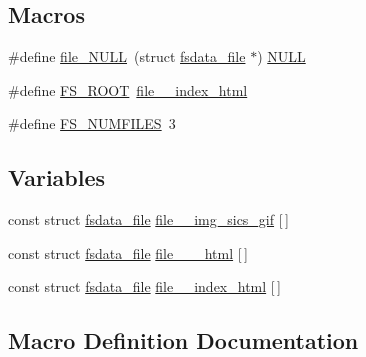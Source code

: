 \subsection*{Macros}
\begin{DoxyCompactItemize}
\item 
\#define \hyperlink{openmote-cc2538_2lwip_2src_2apps_2httpd_2fsdata_8c_a4a4bf9866c570a1420eb218034e0dfde}{file\+\_\+\+N\+U\+LL}~(struct \hyperlink{structfsdata__file}{fsdata\+\_\+file} $\ast$) \hyperlink{openmote-cc2538_2lwip_2src_2include_2lwip_2def_8h_a070d2ce7b6bb7e5c05602aa8c308d0c4}{N\+U\+LL}
\item 
\#define \hyperlink{openmote-cc2538_2lwip_2src_2apps_2httpd_2fsdata_8c_a579e616a9072321cb4da8aa2d64252f2}{F\+S\+\_\+\+R\+O\+OT}~\hyperlink{openmote-cc2538_2lwip_2src_2apps_2httpd_2fsdata_8c_a1908ae237b89f877e8ca1938f471caef}{file\+\_\+\+\_\+index\+\_\+html}
\item 
\#define \hyperlink{openmote-cc2538_2lwip_2src_2apps_2httpd_2fsdata_8c_aa06c00919f77418ad5d5e54141926500}{F\+S\+\_\+\+N\+U\+M\+F\+I\+L\+ES}~3
\end{DoxyCompactItemize}
\subsection*{Variables}
\begin{DoxyCompactItemize}
\item 
const struct \hyperlink{structfsdata__file}{fsdata\+\_\+file} \hyperlink{openmote-cc2538_2lwip_2src_2apps_2httpd_2fsdata_8c_ae4750db2489eb9a18a9483d52544500e}{file\+\_\+\+\_\+img\+\_\+sics\+\_\+gif} \mbox{[}$\,$\mbox{]}
\item 
const struct \hyperlink{structfsdata__file}{fsdata\+\_\+file} \hyperlink{openmote-cc2538_2lwip_2src_2apps_2httpd_2fsdata_8c_af64867f4c16b25ab41d4deef1e39f2f4}{file\+\_\+\+\_\+\_\+html} \mbox{[}$\,$\mbox{]}
\item 
const struct \hyperlink{structfsdata__file}{fsdata\+\_\+file} \hyperlink{openmote-cc2538_2lwip_2src_2apps_2httpd_2fsdata_8c_a1908ae237b89f877e8ca1938f471caef}{file\+\_\+\+\_\+index\+\_\+html} \mbox{[}$\,$\mbox{]}
\end{DoxyCompactItemize}


\subsection{Macro Definition Documentation}
\mbox{\label{openmote-cc2538_2lwip_2src_2apps_2httpd_2fsdata_8c_a4a4bf9866c570a1420eb218034e0dfde}} 
